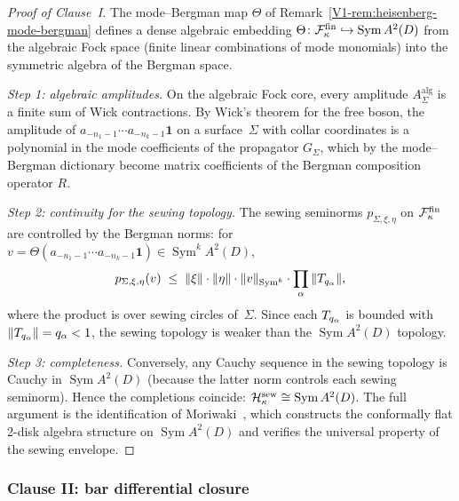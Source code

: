 \begin{proof}[Proof of Clause~I]
The mode--Bergman map $\Theta$ of
Remark~\ref{V1-rem:heisenberg-mode-bergman} defines a dense
algebraic embedding
$\Theta \colon \mathcal{F}_\kappa^{\mathrm{fin}} \hookrightarrow
\operatorname{Sym} A^2(D)$
from the algebraic Fock space (finite linear combinations of
mode monomials) into the symmetric algebra of the Bergman space.

\emph{Step 1: algebraic amplitudes.}
On the algebraic Fock core, every amplitude
$A_\Sigma^{\mathrm{alg}}$ is a finite sum of Wick contractions.
By Wick's theorem for the free boson, the amplitude of
$a_{-n_1-1}\cdots a_{-n_k-1}\mathbf{1}$ on a surface~$\Sigma$
with collar coordinates is a polynomial in the mode
coefficients of the propagator $G_\Sigma$, which by the
mode--Bergman dictionary become matrix coefficients of the
Bergman composition operator $R$.

\emph{Step 2: continuity for the sewing topology.}
The sewing seminorms $p_{\Sigma,\xi,\eta}$ on $\mathcal{F}_\kappa^{\mathrm{fin}}$
are controlled by the Bergman norms: for
$v = \Theta(a_{-n_1-1}\cdots a_{-n_k-1}\mathbf{1})
\in \operatorname{Sym}^k A^2(D)$,
\begin{equation}%
p_{\Sigma,\xi,\eta}(v)
\;\leq\;
\|\xi\| \cdot \|\eta\| \cdot \|v\|_{\operatorname{Sym}^k}
\cdot \prod_\alpha \|\sewop_{q_\alpha}\|,
\end{equation}
where the product is over sewing circles of~$\Sigma$.
Since each $T_{q_\alpha}$ is bounded with
$\|T_{q_\alpha}\| = q_\alpha < 1$, the sewing topology is
weaker than the $\operatorname{Sym} A^2(D)$ topology.

\emph{Step 3: completeness.}
Conversely, any Cauchy sequence in the sewing topology is Cauchy
in $\operatorname{Sym} A^2(D)$ (because the latter norm
controls each sewing seminorm). Hence the completions coincide:
$\mathcal{H}_\kappa^{\mathrm{sew}} \cong \operatorname{Sym} A^2(D)$.
The full argument is the identification of Moriwaki~\cite{Moriwaki26b},
which constructs the conformally flat 2-disk algebra structure
on $\operatorname{Sym} A^2(D)$ and verifies the universal
property of the sewing envelope.
\end{proof}

\subsubsection{Clause II: bar differential closure}

